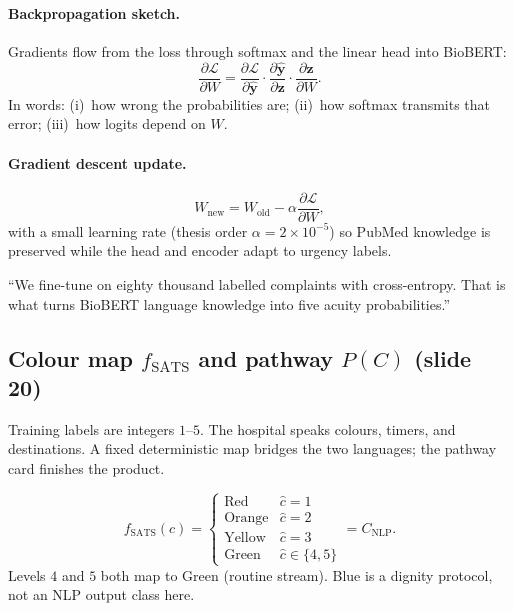\paragraph{Backpropagation sketch.}
Gradients flow from the loss through softmax and the linear head into BioBERT:
\begin{equation}
  \frac{\partial \mathcal{L}}{\partial W}
  = \frac{\partial \mathcal{L}}{\partial \hat{\mathbf{y}}}
  \cdot \frac{\partial \hat{\mathbf{y}}}{\partial \mathbf{z}}
  \cdot \frac{\partial \mathbf{z}}{\partial W}.
\end{equation}
In words: (i)~how wrong the probabilities are; (ii)~how softmax transmits that error; (iii)~how logits depend on \(W\).

\paragraph{Gradient descent update.}
\begin{equation}
  W_{\mathrm{new}} = W_{\mathrm{old}} - \alpha \frac{\partial \mathcal{L}}{\partial W},
\end{equation}
with a small learning rate (thesis order \(\alpha = 2\times 10^{-5}\)) so PubMed knowledge is preserved while the head and encoder adapt to urgency labels.

\begin{saybox}
``We fine-tune on eighty thousand labelled complaints with cross-entropy. That is what turns BioBERT language knowledge into five acuity probabilities.''
\end{saybox}

\subsection{Colour map \(f_{\mathrm{SATS}}\) and pathway \(P(C)\) (slide 20)}
\label{sec:expl-fsats}

\begin{intuitbox}
Training labels are integers \(1\)--\(5\). The hospital speaks colours, timers, and destinations.
A fixed deterministic map bridges the two languages; the pathway card finishes the product.
\end{intuitbox}

\begin{equation}
  f_{\mathrm{SATS}}(\hat{c}) =
  \begin{cases}
    \mathrm{Red} & \hat{c}=1 \\
    \mathrm{Orange} & \hat{c}=2 \\
    \mathrm{Yellow} & \hat{c}=3 \\
    \mathrm{Green} & \hat{c}\in\{4,5\}
  \end{cases}
  = C_{\mathrm{NLP}}.
  \label{eq:fsats}
\end{equation}
Levels \(4\) and \(5\) both map to Green (routine stream). Blue is a dignity protocol, not an NLP output class here.

